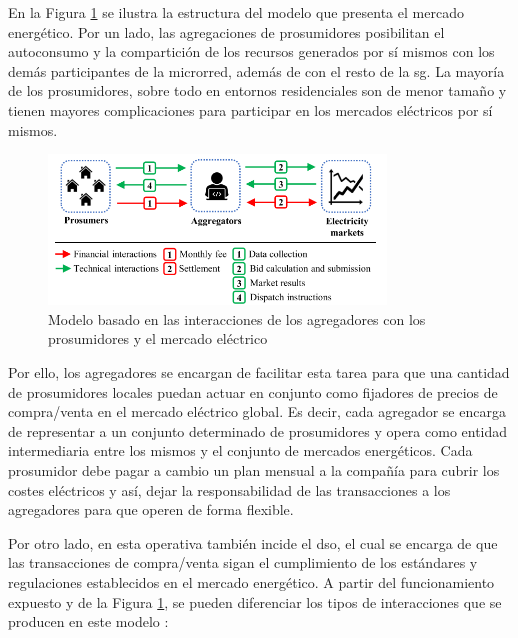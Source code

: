 En la Figura \ref{fig:market} se ilustra la estructura del modelo que presenta el mercado energético. Por un lado, las agregaciones de prosumidores posibilitan el autoconsumo y la compartición de los recursos generados por sí mismos con los demás participantes de la microrred, además de con el resto de la \gls{sg}. La mayoría de los prosumidores, sobre todo en entornos residenciales son de menor tamaño y tienen mayores complicaciones para participar en los mercados eléctricos por sí mismos. 

\vspace{3mm}

\begin{figure}[h!]
  \centering
  \includegraphics[width=0.8\textwidth]{img/teoria/market.png}
  \caption{Modelo basado en las interacciones de los agregadores con los prosumidores y el mercado eléctrico \cite{business}}
  \label{fig:market}
\end{figure}

Por ello, los agregadores \cite{bidding} \cite{transactive} se encargan de facilitar esta tarea para que una cantidad de prosumidores locales puedan actuar en conjunto como fijadores de precios de compra/venta en el mercado eléctrico global. Es decir, cada agregador se encarga de representar a un conjunto determinado de prosumidores y opera como entidad intermediaria entre los mismos y el conjunto de mercados energéticos. Cada prosumidor debe pagar a cambio un plan mensual a la compañía para cubrir los costes eléctricos y así, dejar la responsabilidad de las transacciones a los agregadores para que operen de forma flexible.

\vspace{3mm}

Por otro lado, en esta operativa también incide el \gls{dso}, el cual se encarga de que las transacciones de compra/venta sigan el cumplimiento de los estándares y regulaciones establecidos en el mercado energético. A partir del funcionamiento expuesto y de la Figura \ref{fig:market}, se pueden diferenciar los tipos de interacciones que se producen en este modelo \cite{business}:

